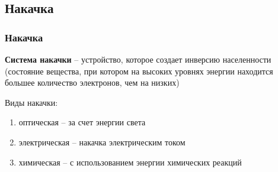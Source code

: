 \documentclass[10pt,pdf,hyperref={unicode}, dvipsnames]{beamer}
\newcommand\frametitless[1]{\subsection{#1}\frametitle{#1}}
\begin{document}
\begin{frame}[t]
	\frametitless{Накачка}
	\textbf{Система накачки} -- устройство, которое создает инверсию населенности (состояние вещества, при  котором на высоких уровнях энергии находится большее количество электронов, чем на низких)


	Виды накачки: 
	\begin{enumerate}
		\item оптическая – за счет энергии света
		\item электрическая – накачка электрическим током
		\item химическая – с использованием энергии химических реакций
	\end{enumerate}
\end{frame}
\end{document}
